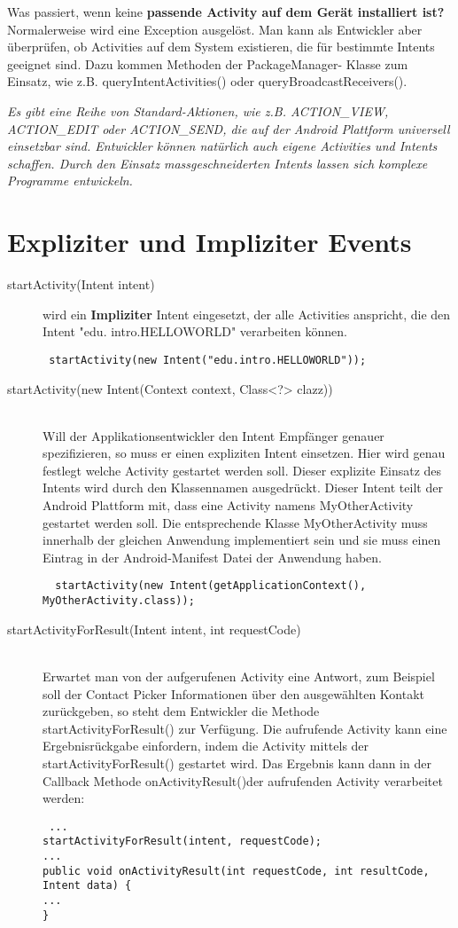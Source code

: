 \documentclass[a4paper,10pt,titlepage=false]{scrreprt}
\begin{document}
Was passiert, wenn keine \textbf{passende Activity auf dem Gerät installiert ist? }Normalerweise wird eine
Exception ausgelöst. Man kann als Entwickler aber überprüfen, ob Activities auf dem System
existieren, die für bestimmte Intents geeignet sind. Dazu kommen Methoden der PackageManager-
Klasse zum Einsatz, wie z.B. queryIntentActivities() oder
queryBroadcastReceivers().

\textit{Es gibt eine Reihe von Standard-Aktionen, wie z.B. ACTION\_VIEW, ACTION\_EDIT oder
ACTION\_SEND, die auf der Android Plattform universell einsetzbar sind. Entwickler können
natürlich auch eigene Activities und Intents schaffen. Durch den Einsatz massgeschneiderten Intents
lassen sich komplexe Programme entwickeln.}

\section{Expliziter und Impliziter Events}
\begin{description}
 \item [startActivity(Intent intent)] wird ein \textbf{Impliziter} Intent eingesetzt, der alle Activities anspricht, die den Intent "edu.
intro.HELLOWORLD" verarbeiten können. 
\begin{verbatim}
 startActivity(new Intent("edu.intro.HELLOWORLD"));
\end{verbatim}
\item[startActivity(new Intent(Context context, Class<?> clazz))] \hfill \\
Will der Applikationsentwickler den Intent Empfänger genauer spezifizieren, so muss er einen
expliziten Intent einsetzen. Hier wird genau festlegt welche Activity gestartet werden soll. Dieser
explizite Einsatz des Intents wird durch den Klassennamen ausgedrückt.
Dieser Intent teilt der Android Plattform mit, dass eine Activity namens MyOtherActivity gestartet
werden soll. Die entsprechende Klasse MyOtherActivity muss innerhalb der gleichen
Anwendung implementiert sein und sie muss einen Eintrag in der Android-Manifest Datei der
Anwendung haben.
\begin{verbatim}
  startActivity(new Intent(getApplicationContext(), MyOtherActivity.class));
\end{verbatim}

\item[startActivityForResult(Intent intent, int requestCode)] \hfill \\
Erwartet man von der aufgerufenen Activity eine Antwort, zum Beispiel soll der Contact Picker
Informationen über den ausgewählten Kontakt zurückgeben, so steht dem Entwickler die Methode
startActivityForResult() zur Verfügung. Die aufrufende Activity kann eine Ergebnisrückgabe
einfordern, indem die Activity mittels der startActivityForResult() gestartet wird. Das
Ergebnis kann dann in der Callback Methode onActivityResult()der aufrufenden Activity
verarbeitet werden:\\
\begin{lstlisting}
 ...
startActivityForResult(intent, requestCode);
...
public void onActivityResult(int requestCode, int resultCode, Intent data) {
...
}
\end{lstlisting}
\end{description}
\end{document}
